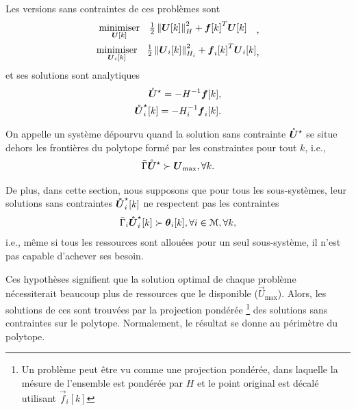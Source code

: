 \documentclass[../main.tex]{subfiles}
\begin{document}
Les versions sans contraintes de ces problèmes sont
\begin{align}
  \label{eq:qp_standard_form_unconstrained_fr}
  \begin{aligned}
    \begin{matrix}
      \mathop{\textrm{minimiser}}\limits_{\boldsymbol{U}[k]} &
                                                 \frac{1}{2}\left\lVert\boldsymbol{U}[k]\right\rVert^{2}_{H} + {\boldsymbol{f}[k]}^{T}\boldsymbol{U}[k] &\\
    \end{matrix},
  \end{aligned}\\
  \label{eq:DOP_local_unconstrained_fr}
  \begin{aligned}
    \begin{matrix}
    \mathop{\textrm{minimiser}}\limits_{\boldsymbol{U}_{i}[k]}&\frac{1}{2}\left\lVert\boldsymbol{U}_{i}[k]\right\rVert^{2}_{H_{i}} + {\boldsymbol{f}_{i}[k]}^{T}\boldsymbol{U}_{i}[k]\\
    \end{matrix},
  \end{aligned}
\end{align}
et ses solutions sont analytiques~\cite{BoydVandenberghe2004}
\begin{align}
  \label{eq:qp_standard_form_unconstrained_solution_fr}
  \optuncU=-H^{-1}\vec{f}[k],\\
  \label{eq:DOP_local_unconstrained_solution_fr}
  \optuncUik=-H_{i}^{-1}\vec{f}_{i}[k].
\end{align}

On appelle un système dépourvu quand la solution sans contrainte ${\mathring{\boldsymbol{U}}^{\star}}$ se situe dehors les frontières du polytope formé par les constraintes pour tout $k$, i.e.,
\begin{equation}
\bar{\Gamma}{\mathring{\boldsymbol{U}}^{\star}}\succ {\boldsymbol{U}}_{\text{max}}, \forall k.
\end{equation}

De plus, dans cette section, nous supposons que pour tous les sous-systèmes, leur solutions sans contraintes $\optuncUik$ ne respectent pas les contraintes
\begin{equation}
\bar{\Gamma}_{i}\optuncUik\succ \thetaik, \forall i\in\set{M}, \forall k,
\end{equation}
i.e., même si tous les ressources sont allouées pour un seul sous-système, il n'est pas capable d'achever ses besoin.

Ces hypothèses signifient que la solution optimal de chaque problème nécessiterait beaucoup plus de ressources que le disponible ($\vec{U}_{\max}$).
Alors, les solutions de ces \qp{} sont trouvées par la projection pondérée
\footnote{Un problème \qp{} peut être vu comme une projection pondérée, dans laquelle la mésure de l'ensemble est pondérée par $H$ et le point original est décalé utilisant $\vec{f}_i[k]$}
des solutions sans contraintes sur le polytope.
Normalement, le résultat se donne au périmètre du polytope.
\end{document}
